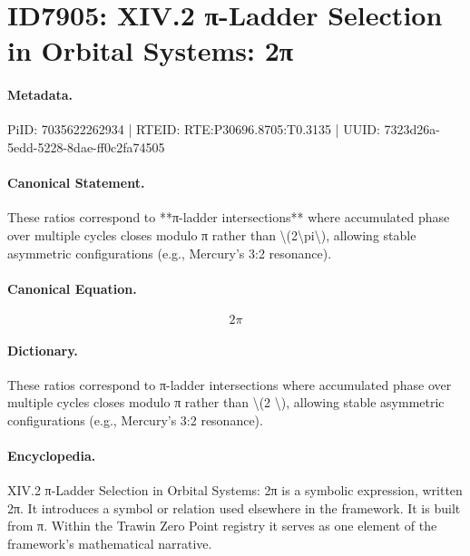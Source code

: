 \section*{ID7905: XIV.2 π-Ladder Selection in Orbital Systems: 2π}
\paragraph{Metadata.}
PiID: 7035622262934 | RTEID: RTE:P30696.8705:T0.3135 | UUID: 7323d26a-5edd-5228-8dae-ff0c2fa74505

\paragraph{Canonical Statement.}
These ratios correspond to **π-ladder intersections** where accumulated phase over multiple cycles closes modulo π rather than \textbackslash{}(2\textbackslash{}pi\textbackslash{}), allowing stable asymmetric configurations (e.g., Mercury’s 3:2 resonance).

\paragraph{Canonical Equation.}
\[
2\pi
\]

\paragraph{Dictionary.}
These ratios correspond to π-ladder intersections where accumulated phase over multiple cycles closes modulo π rather than \textbackslash{}(2 \textbackslash{}), allowing stable asymmetric configurations (e.g., Mercury’s 3:2 resonance).

\paragraph{Encyclopedia.}
XIV.2 π-Ladder Selection in Orbital Systems: 2π is a symbolic expression, written 2π. It introduces a symbol or relation used elsewhere in the framework. It is built from π. Within the Trawin Zero Point registry it serves as one element of the framework's mathematical narrative.
